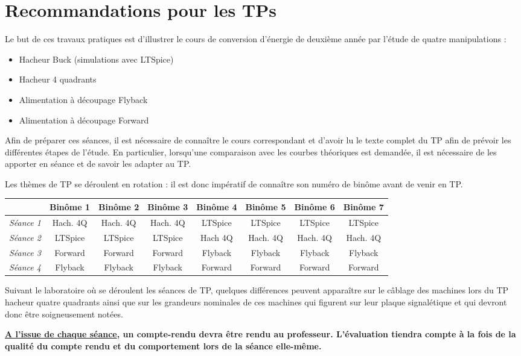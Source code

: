 \chapter{Recommandations pour les TPs}

Le but de ces travaux pratiques est d’illustrer le cours de conversion d’énergie de deuxième année par l’étude de quatre manipulations :

\begin{itemize}
\item Hacheur Buck (simulations avec LTSpice)
\item Hacheur 4 quadrants
\item Alimentation à découpage Flyback
\item Alimentation à découpage Forward
\end{itemize}

Afin de préparer ces séances, il est nécessaire de connaître le cours correspondant et d’avoir lu le texte complet du TP afin de prévoir les différentes étapes de l’étude. En particulier, lorsqu'une comparaison avec les courbes théoriques est demandée, il est nécessaire de les apporter en séance et de savoir les adapter au TP.

Les thèmes de TP se déroulent en rotation : il est donc impératif de connaître son numéro de binôme avant de venir en TP.

\vspace{0.5cm}
\hspace{-1cm}
\begin{tabular}{|c | c | c | c | c | c | c | c|}
\hline
& \textbf{Binôme 1} & \textbf{Binôme 2} & \textbf{Binôme 3} & \textbf{Binôme 4} & \textbf{Binôme 5} & \textbf{Binôme 6} & \textbf{Binôme 7}\\
\hline
\textit{Séance 1} & Hach. 4Q & Hach. 4Q & Hach. 4Q & LTSpice & LTSpice & LTSpice & LTSpice\\
\hline
\textit{Séance 2} & LTSpice & LTSpice & LTSpice & Hach 4Q & Hach. 4Q & Hach. 4Q & Hach. 4Q\\
\hline
\textit{Séance 3} & Forward & Forward & Forward & Flyback & Flyback & Flyback & Flyback\\
\hline
\textit{Séance 4} & Flyback & Flyback & Flyback & Forward & Forward & Forward & Forward\\
\hline
\end{tabular}

\vspace{0.5cm}
Suivant le laboratoire où se déroulent les séances de TP, quelques différences peuvent apparaître sur le câblage des machines lors du TP hacheur quatre quadrants ainsi que sur les grandeurs nominales de ces machines qui figurent sur leur plaque signalétique et qui devront donc être soigneusement notées.

\vspace{0.5cm}
\textbf{\underline{A l’issue de chaque séance}, un compte-rendu devra être rendu au professeur. L’évaluation tiendra compte à la fois de la qualité du compte rendu et du comportement lors de la séance elle-même.}